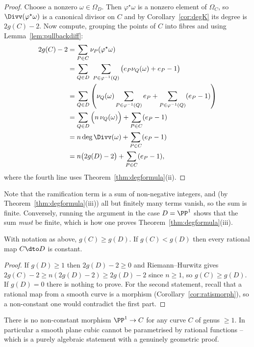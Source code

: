 \begin{proof}
	Choose a nonzero $\omega \in \Omega_D$. Then $\varphi^\star\omega$ is a nonzero element of $\Omega_C$, so $\Divv(\varphi^\star\omega)$ is a canonical divisor on $C$ and by Corollary~\ref{cor:degK} its degree is $2g(C)-2$. Now compute, grouping the points of $C$ into fibres and using Lemma~\ref{lem:pullbackdiff}:
	\begin{align*}
		2g(C)-2 &= \sum_{P\in C}\nu_P(\varphi^\star\omega)\\
		&= \sum_{Q\in D}\ \sum_{P \in \varphi^{-1}(Q)}\big(e_P\nu_Q(\omega) + e_P-1\big)\\
		&= \sum_{Q\in D}\left(\nu_Q(\omega)\sum_{P\in\varphi^{-1}(Q)}e_P + \sum_{P\in\varphi^{-1}(Q)}(e_P-1)\right)\\
		&= \sum_{Q\in D}\Big(n\,\nu_Q(\omega)\Big) + \sum_{P \in C}(e_P-1)\\
		&= n\deg\Divv(\omega) + \sum_{P\in C}(e_P-1)\\
		&= n\big(2g(D)-2\big) + \sum_{P\in C}(e_P-1),
	\end{align*}
	where the fourth line uses Theorem~\ref{thm:degformula}(ii).
\end{proof}

Note that the ramification term is a sum of non-negative integers, and (by Theorem~\ref{thm:degformula}(iii)) all but finitely many terms vanish, so the sum is finite. Conversely, running the argument in the case $D = \PP^1$ shows that the sum \emph{must} be finite, which is how one proves Theorem~\ref{thm:degformula}(iii).

\begin{corollary}\label{cor:genusincrease}
	With notation as above, $g(C) \geq g(D)$. If $g(C) < g(D)$ then every rational map $C \dto D$ is constant.
\end{corollary}

\begin{proof}
	If $g(D) \geq 1$ then $2g(D)-2\geq 0$ and Riemann--Hurwitz gives $2g(C)-2 \geq n(2g(D)-2)\geq 2g(D)-2$ since $n\geq1$, so $g(C)\geq g(D)$. If $g(D) = 0$ there is nothing to prove. For the second statement, recall that a rational map from a smooth curve is a morphism (Corollary~\ref{cor:ratismorph}), so a non-constant one would contradict the first part.
\end{proof}

\begin{example}
	There is no non-constant morphism $\PP^1 \to C$ for any curve $C$ of genus $\geq 1$. In particular a smooth plane cubic cannot be parametrised by rational functions -- which is a purely algebraic statement with a genuinely geometric proof.
\end{example}

